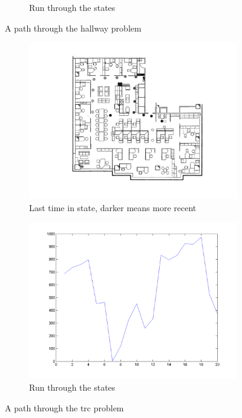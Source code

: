 \documentclass[10pt,a4paper]{article}
\begin{document}
\begin{figure}
\begin{subfigure}{0.48\textwidth}
                \caption{Run through the states}
                \label{fig:path_hallway_part2}
                \hspace{-10pt}
        \end{subfigure}
        \caption{A path through the hallway problem}
        \label{fig:path_hallway}
\end{figure}

\begin{figure}
        \centering
        \begin{subfigure}{0.48\textwidth}
        		\includegraphics[width=\textwidth]{Paths/trc/plot-basic-part1-6129604379.png}
                \caption{Last time in state, darker means more recent}
                \label{fig:path_trc_part1}
                \hspace{10pt}
        \end{subfigure}
        \quad
        \begin{subfigure}{0.48\textwidth}
        		\includegraphics[width=\textwidth]{Paths/trc/plot-basic-part2-6129604379.png}
                \caption{Run through the states}
                \label{fig:path_trc_part2}
                \hspace{-10pt}
        \end{subfigure}
        \caption{A path through the trc problem}
        \label{fig:path_trc}
\end{figure}
\end{document}
